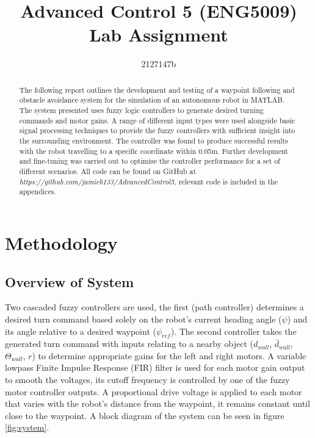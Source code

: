 \documentclass[10pt]{article}
\begin{document}
\title{Advanced Control 5 (ENG5009) \\ \large{Lab Assignment}}
\author{2127147b}
\maketitle

\begin{abstract}
    The following report outlines the development and testing of a waypoint following and obstacle avoidance system for the simulation of an autonomous robot in MATLAB.
    The system presented uses fuzzy logic controllers to generate desired turning commands and motor gains. 
    A range of different input types were used alongside basic signal processing techniques to provide the fuzzy controllers with sufficient insight into the surrounding environment.
    The controller was found to produce successful results with the robot travelling to a specific coordinate within 0.05m. 
    Further development and fine-tuning was carried out to optimise the controller performance for a set of different scenarios.
    All code can be found on GitHub at \textit{https://github.com/jamieb133/AdvancedControl5}, relevant code is included in the appendices.  
    \end{abstract}

\section{Methodology}
\subsection{Overview of System}
Two cascaded fuzzy controllers are used, the first (path controller) determines a desired turn command based solely on the robot's current heading angle ($\psi$) and its angle relative to a desired waypoint ($\psi_{ref}$).
The second controller takes the generated turn command with inputs relating to a nearby object ($d_{wall}$, $\bar{d}_{wall}$, $\Theta_{wall}$, $r$) to determine appropriate gains for the left and right motors.
A variable lowpass Finite Impulse Response (FIR) filter is used for each motor gain output to smooth the voltages, its cutoff frequency is controlled by one of the fuzzy motor controller outputs.
A proportional drive voltage is applied to each motor that varies with the robot's distance from the waypoint, it remains constant until close to the waypoint. 
A block diagram of the system can be seen in figure \ref{fig:system}.
\end{document}
